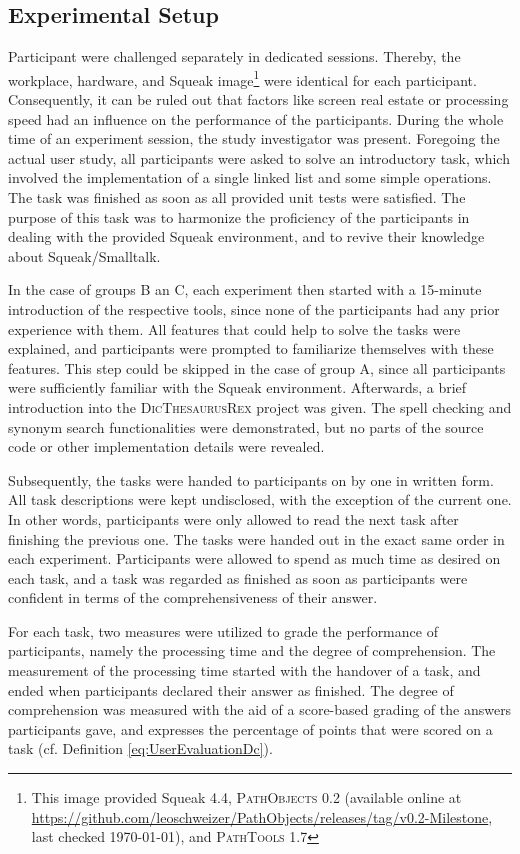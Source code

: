 \subsection{Experimental Setup}
Participant were challenged separately in dedicated sessions.
Thereby, the workplace, hardware, and Squeak image\footnote{This image provided Squeak 4.4, \textsc{PathObjects} 0.2 (available online at \url{https://github.com/leoschweizer/PathObjects/releases/tag/v0.2-Milestone}, last checked \today), and \textsc{PathTools} 1.7} were identical for each participant.
Consequently, it can be ruled out that factors like screen real estate or processing speed had an influence on the performance of the participants. 
During the whole time of an experiment session, the study investigator was present.
Foregoing the actual user study, all participants were asked to solve an introductory task, which involved the implementation of a single linked list and some simple operations.
The task was finished as soon as all provided unit tests were satisfied.
The purpose of this task was to harmonize the proficiency of the participants in dealing with the provided Squeak environment, and to revive their knowledge about Squeak/Smalltalk.

In the case of groups B an C, each experiment then started with a 15-minute introduction of the respective tools, since none of the participants had any prior experience with them.
All features that could help to solve the tasks were explained, and participants were prompted to familiarize themselves with these features. 
This step could be skipped in the case of group A, since all participants were sufficiently familiar with the Squeak environment.
Afterwards, a brief introduction into the \textsc{DicThesaurusRex} project was given.
The spell checking and synonym search functionalities were demonstrated, but no parts of the source code or other implementation details were revealed.

Subsequently, the tasks were handed to participants on by one in written form.
All task descriptions were kept undisclosed, with the exception of the current one.
In other words, participants were only allowed to read the next task after finishing the previous one.
The tasks were handed out in the exact same order in each experiment.
Participants were allowed to spend as much time as desired on each task, and a task was regarded as finished as soon as participants were confident in terms of the comprehensiveness of their answer.

For each task, two measures were utilized to grade the performance of participants, namely the processing time and the degree of comprehension.
The measurement of the processing time started with the handover of a task, and ended when participants declared their answer as finished.
The degree of comprehension was measured with the aid of a score-based grading of the answers participants gave, and expresses the percentage of points that were scored on a task (cf. Definition \ref{eq:UserEvaluationDc}).

